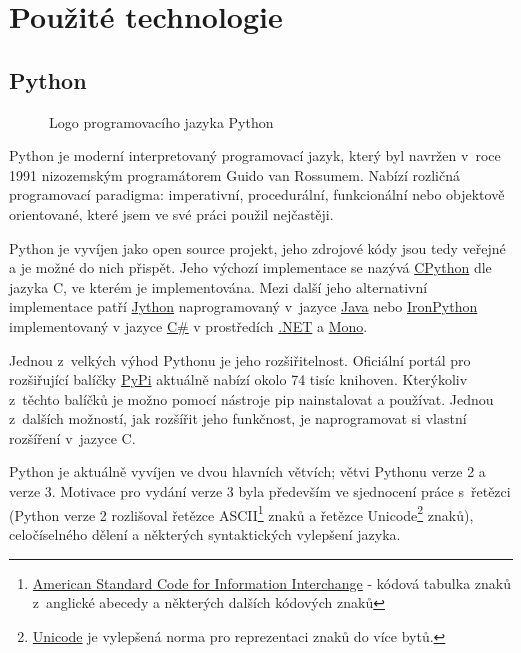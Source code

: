 \section{Použité technologie}
\label{sec:used-technologies}

\subsection{Python}
\label{subsec:python}

\begin{figure}[H]
 \centering
 
 \caption{Logo programovacího jazyka Python}
\end{figure}

\begin{sloppypar}
	Python je moderní interpretovaný programovací jazyk, který byl navržen v~roce 1991\cite{python-docs} nizozemským programátorem Guido van Rossumem. Nabízí rozličná programovací paradigma: imperativní, procedurální, funkcionální nebo objektově orientované, které jsem ve své práci použil nejčastěji.

	Python je vyvíjen jako open source projekt, jeho zdrojové kódy jsou tedy veřejné a je možné do nich přispět. Jeho výchozí implementace se nazývá \href{https://en.wikipedia.org/wiki/CPython}{CPython} dle jazyka C, ve kterém je implementována. Mezi další jeho alternativní implementace patří \href{https://cs.wikipedia.org/wiki/Jython}{Jython} naprogramovaný v~jazyce \href{https://cs.wikipedia.org/wiki/Java_%28programovac%C3%AD_jazyk%29}{Java} nebo \href{https://cs.wikipedia.org/wiki/IronPython}{IronPython} implementovaný v jazyce \href{https://cs.wikipedia.org/wiki/C_Sharp}{C\#} v prostředích \href{https://cs.wikipedia.org/wiki/.NET}{.NET} a \href{https://cs.wikipedia.org/wiki/Mono_%28platforma%29}{Mono}.

	Jednou z~velkých výhod Pythonu je jeho rozšiřitelnost. Oficiální portál pro rozšiřující balíčky \href{https://pypi.python.org/pypi}{PyPi} aktuálně nabízí okolo 74 tisíc knihoven. Kterýkoliv z~těchto balíčků je možno pomocí nástroje pip nainstalovat a používat. Jednou z~dalších možností, jak rozšířit jeho funkčnost, je naprogramovat si vlastní rozšíření v~jazyce C.

	Python je aktuálně vyvíjen ve dvou hlavních větvích; větvi Pythonu verze 2 a verze 3. Motivace pro vydání verze 3 byla především ve sjednocení práce s~řetězci (Python verze 2 rozlišoval řetězce ASCII\footnote{\href{https://cs.wikipedia.org/wiki/ASCII}{American Standard Code for Information Interchange} - kódová tabulka znaků z~anglické abecedy a některých dalších kódových znaků} znaků a řetězce Unicode\footnote{\href{https://cs.wikipedia.org/wiki/Unicode}{Unicode} je vylepšená norma pro reprezentaci znaků do více bytů.} znaků), celočíselného dělení a některých syntaktických vylepšení jazyka.
\end{sloppypar}

